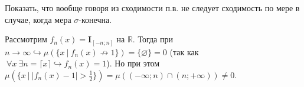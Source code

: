 \begin{task}{2}
    Показать, что вообще говоря из сходимости п.в. не следует сходимость по мере в случае, когда мера $\sigma$-конечна.
    
\end{task}
\begin{solution}
    Рассмотрим $f_n(x) = \mathbf{I}_{[-n; n]}$ на $\mathbb{R}$. Тогда при $n \rightarrow \infty \hookrightarrow \mu(\{x~|~ f_n(x) \nrightarrow 1\}) = \{\varnothing\} = 0$\hspace{2mm} (так как $ ~ \forall x ~ \exists  n = \lceil x \rceil \hookrightarrow f_n(x) = 1$). Но при этом $\mu(\{x~|~ |f_n(x) - 1| > \frac{1}{2} \}) = \mu((- \infty;n) \cap (n;+\infty)) \neq 0$. 
\end{solution}